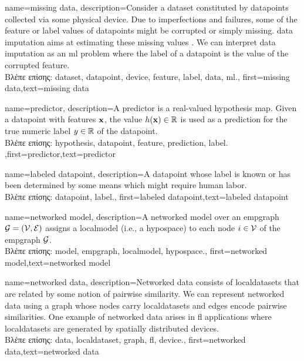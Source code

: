 {name={missing data},
	description={Consider a \gls{dataset} constituted by \gls{datapoint}s collected via 
		some physical \gls{device}. Due to imperfections and failures, some of the \gls{feature} 
		or \gls{label} values of \gls{datapoint}s might be corrupted or simply missing. 
		\Gls{data} imputation aims at estimating these missing values \cite{Abayomi2008DiagnosticsFM}. 
		We can interpret \gls{data} imputation as an \gls{ml} problem where the \gls{label} of a \gls{datapoint} is 
		the value of the corrupted \gls{feature}.\\
		\foreignlanguage{greek}{Βλέπε επίσης:} \gls{dataset}, \gls{datapoint}, \gls{device}, \gls{feature}, \gls{label}, \gls{data}, \gls{ml}.},
	first={missing data},text={missing data}  
}

{name={predictor},
	description={A predictor is a real-valued \gls{hypothesis} map. 
		Given a \gls{datapoint} with \gls{feature}s ${\bf x}$, the value 
		$h({\bf x}) \in \mathbb{R}$ is used as a \gls{prediction} for the true 
		numeric \gls{label} $y \in \mathbb{R}$ of the \gls{datapoint}.\\
		\foreignlanguage{greek}{Βλέπε επίσης:} \gls{hypothesis}, \gls{datapoint}, \gls{feature}, \gls{prediction}, \gls{label}.
		},first={predictor},text={predictor}  
}

{name={labeled datapoint},
 description={A \gls{datapoint} whose \gls{label} is known or has been determined 
 	by some means which might require human labor.\\
	\foreignlanguage{greek}{Βλέπε επίσης:} \gls{datapoint}, \gls{label}.},
 first={labeled datapoint},text={labeled datapoint}  
}

{name={networked model},
  description={A networked \gls{model} over an \gls{empgraph} $\mathcal{G} = \left( \mathcal{V},\mathcal{E} \right)$ assigns 
   a \gls{localmodel} (i.e., a \gls{hypospace}) to each node $i \in \mathcal{V}$ of the \gls{empgraph} $\mathcal{G}$.\\
   \foreignlanguage{greek}{Βλέπε επίσης:} \gls{model}, \gls{empgraph}, \gls{localmodel}, \gls{hypospace}.}, 
   first={networked model},text={networked model}  
}

{name={networked data},
	description={Networked \gls{data} consists of \gls{localdataset}s 
	that are related by some notion of pairwise similarity. We can represent networked 
	\gls{data} using a \gls{graph} whose nodes carry \gls{localdataset}s and edges encode 
	pairwise similarities. One example of networked \gls{data} arises in \gls{fl} applications 
	where \gls{localdataset}s are generated by spatially distributed \gls{device}s.\\
	\foreignlanguage{greek}{Βλέπε επίσης:} \gls{data}, \gls{localdataset}, \gls{graph}, \gls{fl}, \gls{device}.}, 
	first={networked data},text={networked data}  
}

